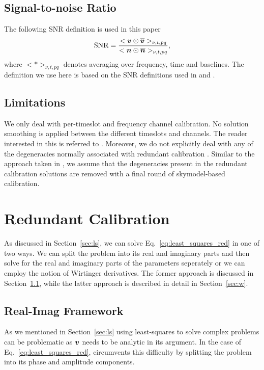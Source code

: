 \documentclass[useAMS,usenatbib]{mn2e}
\newcommand{\bv}{\bmath{v}}
\newcommand{\bn}{\bmath{n}}
\newcommand{\conj}[1]{\overline{#1}}
\begin{document}
\subsection{Signal-to-noise Ratio}
\label{sec:snr}
The following SNR definition is used in this paper  
\begin{equation}
\label{}
\textrm{SNR} = \frac{<\bv\odot\conj{\bv}>_{\nu,t,pq}}{<\bn\odot\conj{\bn}>_{\nu,t,pq}}, 
\end{equation}
where $<*>_{\nu,t,pq}$ denotes averaging over frequency, time and baselines. The definition we use here is based on the SNR definitions used in \citet{Liu2010} and \citet{Marthi2014}.

\subsection{Limitations}
\label{sec:scope}
We only deal with per-timeslot and frequency channel calibration. No solution smoothing  
is applied between the different timeslots and channels. The reader interested in this is referred to \citep{Zheng2014}. 
Moreover, we do not explicitly deal with any of the degeneracies normally associated with redundant calibration \citep{Zheng2014,Kurien2016}. Similar to the approach taken in \citep{Marthi2014}, we assume that the degeneracies present in the redundant calibration solutions are removed with a final round of skymodel-based calibration.

\section{Redundant Calibration}
\label{sec:main_sec}
As discussed in Section~\ref{sec:ls}, we can solve Eq.~\eqref{eq:least_squares_red} in one of two ways. We can split the problem into its real and
imaginary parts and then solve for the real and imaginary parts of the parameters seperately or we can employ the notion of Wirtinger derivatives. The former 
approach is discussed in Section~\ref{sec:ri}, while the latter approach is described in detail in Section~\ref{sec:w}. 

\subsection{Real-Imag Framework}
\label{sec:ri}
As we mentioned in Section~\ref{sec:ls} using least-squares to solve complex problems can be problematic as $\bv$ needs to be analytic in its argument. In the case 
of Eq.~\eqref{eq:least_squares_red}, \citet{Liu2010} circumvents this difficulty by 
splitting the problem into its phase and amplitude components. 
\end{document}
